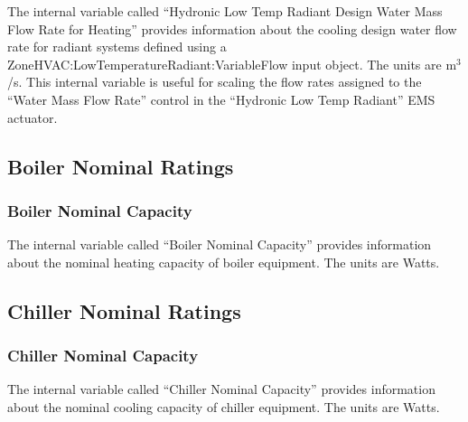 The internal variable called ``Hydronic Low Temp Radiant Design Water Mass Flow Rate for Heating'' provides information about the cooling design water flow rate for radiant systems defined using a ZoneHVAC:LowTemperatureRadiant:VariableFlow input object. The units are m\(^{3}\)/s. This internal variable is useful for scaling the flow rates assigned to the ``Water Mass Flow Rate'' control in the ``Hydronic Low Temp Radiant'' EMS actuator.

\subsection{Boiler Nominal Ratings}\label{boiler-nominal-ratings}

\subsubsection{Boiler Nominal Capacity}\label{boiler-nominal-capacity}

The internal variable called ``Boiler Nominal Capacity'' provides information about the nominal heating capacity of boiler equipment. The units are Watts.

\subsection{Chiller Nominal Ratings}\label{chiller-nominal-ratings}

\subsubsection{Chiller Nominal Capacity}\label{chiller-nominal-capacity}

The internal variable called ``Chiller Nominal Capacity'' provides information about the nominal cooling capacity of chiller equipment. The units are Watts.
